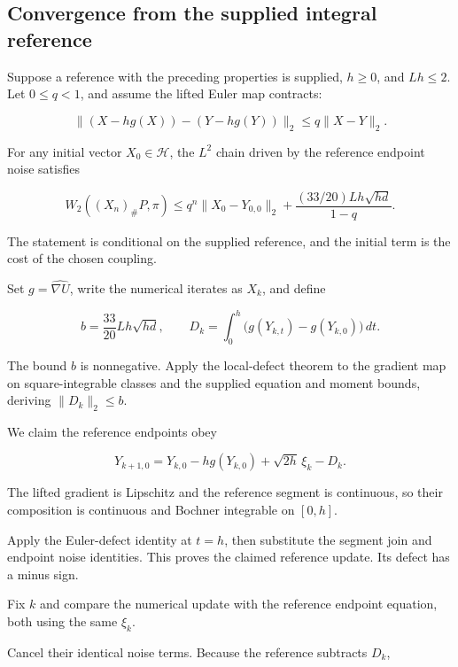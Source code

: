 \documentclass[11pt,a4paper]{report}
\begin{document}
\subsection{\texorpdfstring{Convergence from the supplied integral reference}{Convergence from the supplied integral reference}}
\label{report-step-UnadjustedLangevin-HilbertDalalyan-lean-4}


Suppose a reference with the preceding properties is supplied, \(h\ge0\), and \(Lh\le2\). Let \(0\le q<1\), and assume the lifted Euler map contracts:

\[\|(X-hg(X))-(Y-hg(Y))\|_2\le q\|X-Y\|_2.\]

For any initial vector \(X_0\in\mathcal H\), the \(L^2\) chain driven by the reference endpoint noise satisfies

\[W_2((X_n)_\#P,\pi)\le q^n\|X_0-Y_{0,0}\|_2+\frac{(33/20)Lh\sqrt{hd}}{1-q}.\]

The statement is conditional on the supplied reference, and the initial term is the cost of the chosen coupling.



Set \(g=\widehat{\nabla U}\), write the numerical iterates as \(X_k\), and define

\[b=\frac{33}{20}Lh\sqrt{hd},\qquad D_k=\int_0^h\bigl(g(Y_{k,t})-g(Y_{k,0})\bigr)\,dt.\]

The bound \(b\) is nonnegative. Apply the local-defect theorem to the gradient map on square-integrable classes and the supplied equation and moment bounds, deriving \(\|D_k\|_2\le b\).



We claim the reference endpoints obey

\[Y_{k+1,0}=Y_{k,0}-hg(Y_{k,0})+\sqrt{2h}\,\xi_k-D_k.\]

The lifted gradient is Lipschitz and the reference segment is continuous, so their composition is continuous and Bochner integrable on \([0,h]\).



Apply the Euler-defect identity at \(t=h\), then substitute the segment join and endpoint noise identities. This proves the claimed reference update. Its defect has a minus sign.



Fix \(k\) and compare the numerical update with the reference endpoint equation, both using the same \(\xi_k\).



Cancel their identical noise terms. Because the reference subtracts \(D_k\),
\end{document}
